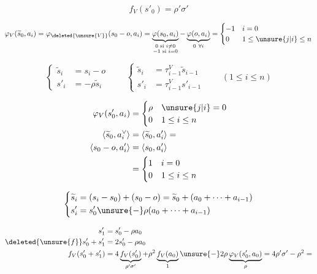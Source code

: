 \[
\boxed{f_V(s'_0)=\rho'\sigma'}
\]

\[
\varphi_V(\widetilde{s}_0,a_i)=\varphi_{\deleted{\unsure{V}}}(s_0-o,a_i)=
\underbrace{\varphi(s_0,a_i)}_{\substack{0\text{ si }i\ne0\\-1\text{ si }i=0}}
-\underbrace{\varphi(o,a_i)}_{0\ \forall i}
=\begin{cases}-1&i=0\\0&1\le\unsure{j|i}\le n\end{cases}
\]

\[
\left\{\begin{aligned}\widetilde{s}_i&=s_i-o\\s'_i&=-\rho\widetilde{s}_i\end{aligned}\right.
\qquad\left\{\begin{aligned}
\widetilde{s}_i&=\tau_{i-1}^V\widetilde{s}_{i-1}\\
s'_i&=\tau_{i-1}^V s'_{i-1}
\end{aligned}\right.\qquad(1\le i\le n)
\]

\[
\begin{aligned}
\varphi_V(s'_0,a_i)&=\begin{cases}\rho&\unsure{j|i}=0\\0&1\le i\le n\end{cases}\\
\langle\widetilde{s}_0,a_i^\vee\rangle&=\langle\widetilde{s}_0,a'_i\rangle=\\
\langle s_0-o,a'_i\rangle&=\langle s_0,a'_i\rangle\\
&=\begin{cases}1&i=0\\0&1\le i\le n\end{cases}
\end{aligned}
\]

\[
\left\{\begin{aligned}
\widetilde{s}_i&=(s_i-s_0)+(s_0-o)=\widetilde{s}_0+(a_0+\cdots+a_{i-1})\\
s'_i&=s'_0\unsure{-}\rho(a_0+\cdots+a_{i-1})
\end{aligned}\right.
\]

\[
\begin{aligned}
s'_1&=s'_0-\rho a_0\\
\deleted{\unsure{f}}s'_0+s'_1&=2s'_0-\rho a_0\\
f_V(s'_0+s'_1)&=4\underbrace{f_V(s'_0)}_{\rho'\sigma'}+\rho^2
\underbrace{f_V(a_0)}_1\unsure{-}2\rho\underbrace{\varphi_V(s'_0,a_0)}_\rho
=4\rho'\sigma'-\rho^2=
\end{aligned}
\]

